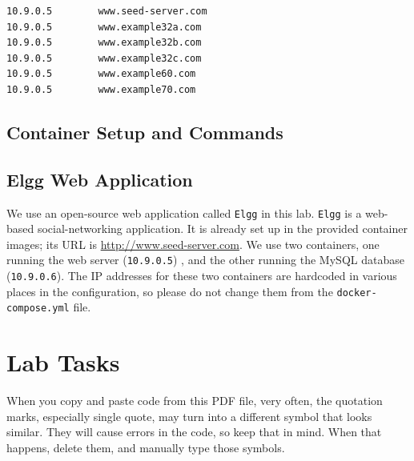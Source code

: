 \begin{lstlisting}
10.9.0.5        www.seed-server.com
10.9.0.5        www.example32a.com
10.9.0.5        www.example32b.com
10.9.0.5        www.example32c.com
10.9.0.5        www.example60.com
10.9.0.5        www.example70.com
\end{lstlisting}
 

\subsection{Container Setup and Commands}





\subsection{Elgg Web Application}

We use an open-source web application called {\tt Elgg} in this lab.
{\tt Elgg} is a web-based social-networking application.
It is already set up in the provided container images; 
its URL is \url{http://www.seed-server.com}.
We use two containers, one running the web server (\texttt{10.9.0.5}) ,
and the other running the MySQL database (\texttt{10.9.0.6}). 
The IP addresses for these two containers are hardcoded in various 
places in the configuration, so please do not change them from
the \texttt{docker-compose.yml} file. 








\section{Lab Tasks}

When you copy and paste code from this PDF file, very often, the 
quotation marks, especially single quote, may turn into 
a different symbol that looks similar. They will cause 
errors in the code, so keep that in mind. When that happens,
delete them, and manually type those symbols.



